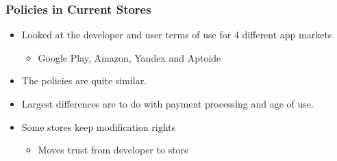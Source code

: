 \documentclass{beamer}
\begin{document}
\begin{frame}
  \frametitle{Policies in Current Stores}
  \begin{itemize}
  \item Looked at the developer and user terms of use for 4 different app
    markets
    \begin{itemize}
    \item Google Play, Amazon, Yandex and Aptoide
    \end{itemize}
  \item The policies are quite similar.
  \item Largest differences are to do with payment processing and age of use.
  \item Some stores keep modification rights
    \begin{itemize}
    \item Moves trust from developer to store
    \end{itemize}
  \end{itemize}
\end{frame}
\end{document}
